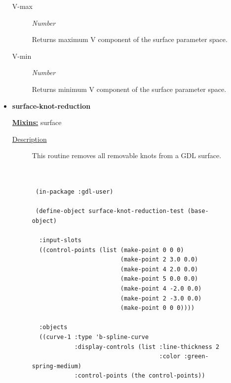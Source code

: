 \documentclass [11pt]{book}
\begin{document}
\begin{itemize}
\begin{description}
\item [V-max]
\emph{Number}

 Returns maximum V component of the surface parameter space.




\item [V-min]
\emph{Number}

 Returns minimum V component of the surface parameter space.




\end{description}







\item {}
\label{prim:surface-knot-reduction}
\textbf{surface-knot-reduction}


\textbf{
\underline{Mixins:}} surface





\begin{description}

\item [
\underline{Description}]


This routine  removes  all  removable  knots  from a GDL surface.



\end{description}




\begin{figure}
\begin{lrbox}{\boxedverb}
\begin{minipage}{\linewidth}
{\small

\begin{verbatim}

 
 (in-package :gdl-user)

 (define-object surface-knot-reduction-test (base-object) 

  :input-slots
  ((control-points (list (make-point 0 0 0)
                         (make-point 2 3.0 0.0) 
                         (make-point 4 2.0 0.0) 
                         (make-point 5 0.0 0.0) 
                         (make-point 4 -2.0 0.0) 
                         (make-point 2 -3.0 0.0) 
                         (make-point 0 0 0))))

  :objects
  ((curve-1 :type 'b-spline-curve
            :display-controls (list :line-thickness 2 
                                    :color :green-spring-medium)
            :control-points (the control-points))


\end{verbatim}}
\end{minipage}
\end{lrbox}
\end{figure}
\end{itemize}
\end{document}
